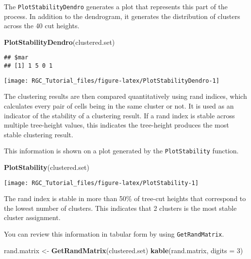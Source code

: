 \documentclass[]{article}
\newenvironment{Shaded}{\begin{snugshade}}{\end{snugshade}}
\newcommand{\DataTypeTok}[1]{\textcolor[rgb]{0.13,0.29,0.53}{#1}}
\newcommand{\DecValTok}[1]{\textcolor[rgb]{0.00,0.00,0.81}{#1}}
\newcommand{\KeywordTok}[1]{\textcolor[rgb]{0.13,0.29,0.53}{\textbf{#1}}}
\newcommand{\NormalTok}[1]{#1}
\newcommand{\StringTok}[1]{\textcolor[rgb]{0.31,0.60,0.02}{#1}}
\begin{document}
The \texttt{PlotStabilityDendro} generates a plot that represents this
part of the process. In addition to the dendrogram, it generates the
distribution of clusters across the 40 cut heights.

\begin{Shaded}
\begin{Highlighting}[]
\KeywordTok{PlotStabilityDendro}\NormalTok{(clustered.set)}
\end{Highlighting}
\end{Shaded}

\begin{verbatim}
## $mar
## [1] 1 5 0 1
\end{verbatim}

\begin{center}\texttt{[image: RGC\_Tutorial\_files/figure-latex/PlotStabilityDendro-1]} \end{center}

The clustering results are then compared quantitatively using rand
indices, which calculates every pair of cells being in the same cluster
or not. It is used as an indicator of the stability of a clustering
result. If a rand index is stable across multiple tree-height values,
this indicates the tree-height produces the most stable clustering
result.

This information is shown on a plot generated by the
\texttt{PlotStability} function.

\begin{Shaded}
\begin{Highlighting}[]
\KeywordTok{PlotStability}\NormalTok{(clustered.set)}
\end{Highlighting}
\end{Shaded}

\begin{center}\texttt{[image: RGC\_Tutorial\_files/figure-latex/PlotStability-1]} \end{center}

The rand index is stable in more than 50\% of tree-cut heights that
correspond to the lowest number of clusters. This indicates that 2
clusters is the most stable cluster assignment.

You can review this information in tabular form by using
\texttt{GetRandMatrix}.

\begin{Shaded}
\begin{Highlighting}[]
\NormalTok{rand.matrix <-}\StringTok{ }\KeywordTok{GetRandMatrix}\NormalTok{(clustered.set)}
\KeywordTok{kable}\NormalTok{(rand.matrix, }\DataTypeTok{digits =} \DecValTok{3}\NormalTok{)}
\end{Highlighting}
\end{Shaded}
\end{document}
